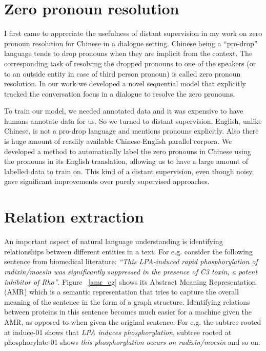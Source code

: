 \documentclass[11pt,a4paper]{article}
\begin{document}
\section{Zero pronoun resolution}
I first came to appreciate the usefulness of distant supervision in my work on zero pronoun resolution for Chinese \cite{rao-EtAl:2015:NAACL-HLT} in a dialogue setting. Chinese being a ``pro-drop'' language tends to drop pronouns when they are implicit from the context. %
The corresponding task of resolving the dropped pronouns to one of the speakers (or to an outside entity in case of third person pronoun) is called zero pronoun resolution. In our work we developed a novel sequential model that explicitly tracked the conversation focus in a dialogue to resolve the zero pronouns. 

To train our model, we needed annotated data and it was expensive to have humans annotate data for us. So we turned to distant supervision. English, unlike Chinese, is not a pro-drop language and mentions pronouns explicitly. Also there is huge amount of readily available Chinese-English parallel corpora. We developed a method to automatically label the zero pronouns in Chinese using the pronouns in its English translation, allowing us to have a large amount of labelled data to train on. This kind of a distant supervision, even though noisy, gave significant improvements over purely supervised approaches.

\section{Relation extraction}
An important aspect of natural language understanding is identifying relationships between different entities in a text. For e.g. consider the following sentence from biomedical literature: \textit{``This LPA-induced rapid phosphorylation of radixin/moesin was significantly suppressed in the presence of C3 toxin, a potent inhibitor of Rho''}. Figure ~\ref{amr_eg} shows its Abstract Meaning Representation (AMR) \cite{banarescu2013abstract} which is a semantic representation that tries to capture the overall meaning of the sentence in the form of a graph structure. Identifying relations between proteins in this sentence becomes much easier for a machine given the AMR, as opposed to when given the original sentence. For e.g. the subtree rooted at induce-01 shows that \textit{LPA induces phosphorylation}, subtree rooted at phosphorylate-01 shows \textit{this phosphorylation occurs on radixin/moesin} and so on. 
\end{document}

